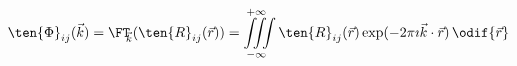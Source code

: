 \begin{equation}\label{eq:hit_velocity_spectrum_tensor}
  \ten{\Phi}_{ij}(\vec{k})= \FT_{\kern-0.3em\vec{k}}(\ten{R}_{ij}(\vec{r})) =
    \iiint \limits_{-\infty}^{+\infty}
      \ten{R}_{ij}(\vec{r})\exp(-2\pi\imath\vec{k}\cdot\vec{r}) \, \odif{\vec{r}}
\end{equation}
